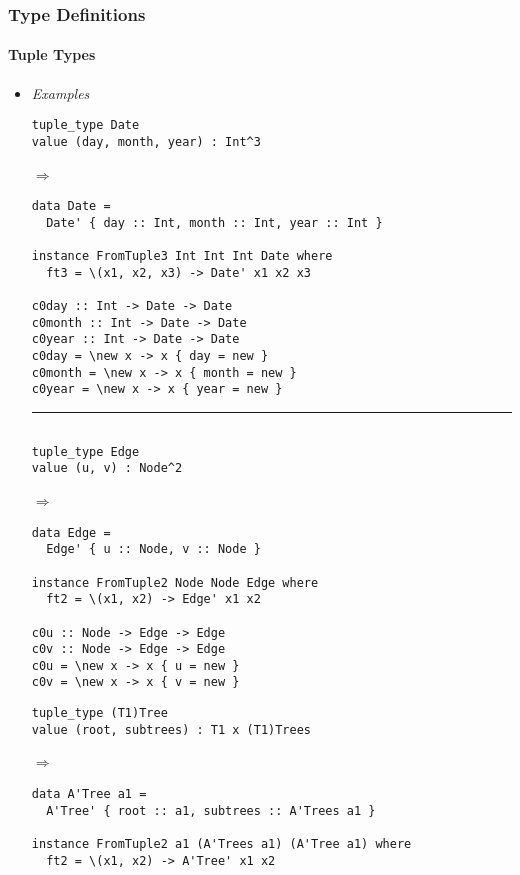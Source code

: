 \documentclass{article}
\def\lra{$\Longrightarrow$\ }
\begin{document}
\newpage
\subsubsection{Type Definitions}
\label{subsubsec:trantypedef}

\paragraph{Tuple Types}

\begin{itemize}
\item
\textit{Examples}

\begin{verbatim}
tuple_type Date
value (day, month, year) : Int^3
\end{verbatim}
\lra
\begin{verbatim}
data Date =
  Date' { day :: Int, month :: Int, year :: Int }

instance FromTuple3 Int Int Int Date where
  ft3 = \(x1, x2, x3) -> Date' x1 x2 x3

c0day :: Int -> Date -> Date
c0month :: Int -> Date -> Date
c0year :: Int -> Date -> Date
c0day = \new x -> x { day = new }
c0month = \new x -> x { month = new }
c0year = \new x -> x { year = new }

\end{verbatim}

\rule{\linewidth}{0.1pt}

\begin{verbatim}

tuple_type Edge
value (u, v) : Node^2
\end{verbatim}
\lra
\begin{verbatim}
data Edge =
  Edge' { u :: Node, v :: Node }

instance FromTuple2 Node Node Edge where
  ft2 = \(x1, x2) -> Edge' x1 x2

c0u :: Node -> Edge -> Edge
c0v :: Node -> Edge -> Edge
c0u = \new x -> x { u = new }
c0v = \new x -> x { v = new }
\end{verbatim}

\newpage
\begin{verbatim}
tuple_type (T1)Tree
value (root, subtrees) : T1 x (T1)Trees
\end{verbatim}
\lra
\begin{verbatim}
data A'Tree a1 =
  A'Tree' { root :: a1, subtrees :: A'Trees a1 }

instance FromTuple2 a1 (A'Trees a1) (A'Tree a1) where
  ft2 = \(x1, x2) -> A'Tree' x1 x2


\end{verbatim}
\end{itemize}
\end{document}
